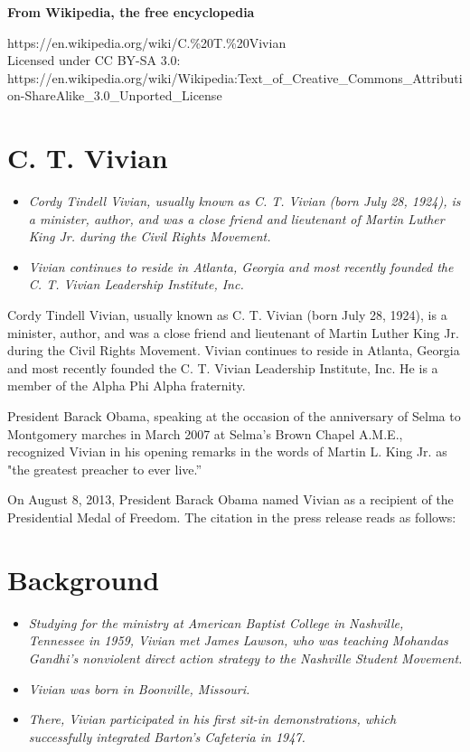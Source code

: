 \textbf{From Wikipedia, the free encyclopedia}

https://en.wikipedia.org/wiki/C.\%20T.\%20Vivian\\
Licensed under CC BY-SA 3.0:\\
https://en.wikipedia.org/wiki/Wikipedia:Text\_of\_Creative\_Commons\_Attribution-ShareAlike\_3.0\_Unported\_License

\section{C. T. Vivian}\label{c.-t.-vivian}

\begin{itemize}
\item
  \emph{Cordy Tindell Vivian, usually known as C. T. Vivian (born July
  28, 1924), is a minister, author, and was a close friend and
  lieutenant of Martin Luther King Jr. during the Civil Rights
  Movement.}
\item
  \emph{Vivian continues to reside in Atlanta, Georgia and most recently
  founded the C. T. Vivian Leadership Institute, Inc.}
\end{itemize}

Cordy Tindell Vivian, usually known as C. T. Vivian (born July 28,
1924), is a minister, author, and was a close friend and lieutenant of
Martin Luther King Jr. during the Civil Rights Movement. Vivian
continues to reside in Atlanta, Georgia and most recently founded the C.
T. Vivian Leadership Institute, Inc. He is a member of the Alpha Phi
Alpha fraternity.

President Barack Obama, speaking at the occasion of the anniversary of
Selma to Montgomery marches in March 2007 at Selma's Brown Chapel
A.M.E., recognized Vivian in his opening remarks in the words of Martin
L. King Jr. as "the greatest preacher to ever live.''

On August 8, 2013, President Barack Obama named Vivian as a recipient of
the Presidential Medal of Freedom. The citation in the press release
reads as follows:

\section{Background}\label{background}

\begin{itemize}
\item
  \emph{Studying for the ministry at American Baptist College in
  Nashville, Tennessee in 1959, Vivian met James Lawson, who was
  teaching Mohandas Gandhi's nonviolent direct action strategy to the
  Nashville Student Movement.}
\item
  \emph{Vivian was born in Boonville, Missouri.}
\item
  \emph{There, Vivian participated in his first sit-in demonstrations,
  which successfully integrated Barton's Cafeteria in 1947.}
\end{itemize}

